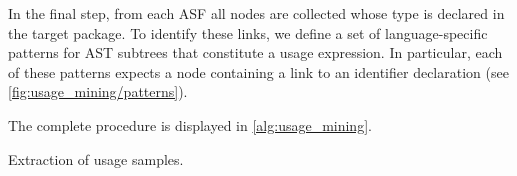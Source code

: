In the final step, from each ASF all nodes are collected whose type is declared in the target package.
To identify these links, we define a set of language-specific patterns for AST subtrees that constitute a usage expression.
In particular, each of these patterns expects a node containing a link to an identifier declaration (see \cref{fig:usage_mining/patterns}).

The complete procedure is displayed in \cref{alg:usage_mining}.

\begin{algorithm}
	\caption{Extraction of usage samples.}\label{alg:usage_mining}

	\;
\end{algorithm}
